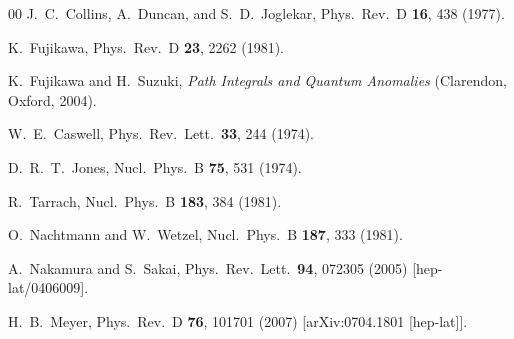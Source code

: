 \begin{thebibliography}{00}
  J.~C.~Collins, A.~Duncan, and S.~D.~Joglekar,
  Phys.\ Rev.\ D {\bf 16}, 438 (1977).

  K.~Fujikawa,
  Phys.\ Rev.\ D {\bf 23}, 2262 (1981).

  K.~Fujikawa and H.~Suzuki,
  {\it Path Integrals and Quantum Anomalies\/} (Clarendon, Oxford, 2004).

  W.~E.~Caswell,
  Phys.\ Rev.\ Lett.\  {\bf 33}, 244 (1974).

  D.~R.~T.~Jones,
  Nucl.\ Phys.\ B {\bf 75}, 531 (1974).

  R.~Tarrach,
  Nucl.\ Phys.\ B {\bf 183}, 384 (1981).

  O.~Nachtmann and W.~Wetzel,
  Nucl.\ Phys.\ B {\bf 187}, 333 (1981).

  A.~Nakamura and S.~Sakai,
  Phys.\ Rev.\ Lett.\  {\bf 94}, 072305 (2005)
  [hep-lat/0406009].

  H.~B.~Meyer,
  Phys.\ Rev.\ D {\bf 76}, 101701 (2007)
  [arXiv:0704.1801 [hep-lat]].


\end{thebibliography}
